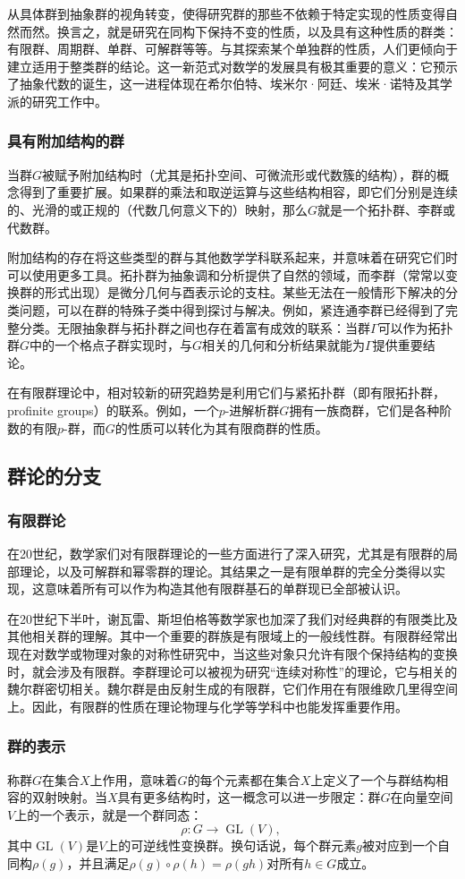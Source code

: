 从具体群到抽象群的视角转变，使得研究群的那些不依赖于特定实现的性质变得自然而然。换言之，就是研究在同构下保持不变的性质，以及具有这种性质的群类：有限群、周期群、单群、可解群等等。与其探索某个单独群的性质，人们更倾向于建立适用于整类群的结论。这一新范式对数学的发展具有极其重要的意义：它预示了抽象代数的诞生，这一进程体现在希尔伯特、埃米尔·阿廷、埃米·诺特及其学派的研究工作中。
\subsubsection{具有附加结构的群}
当群$G$被赋予附加结构时（尤其是拓扑空间、可微流形或代数簇的结构），群的概念得到了重要扩展。如果群的乘法和取逆运算与这些结构相容，即它们分别是连续的、光滑的或正规的（代数几何意义下的）映射，那么$G$就是一个拓扑群、李群或代数群。

附加结构的存在将这些类型的群与其他数学学科联系起来，并意味着在研究它们时可以使用更多工具。拓扑群为抽象调和分析提供了自然的领域，而李群（常常以变换群的形式出现）是微分几何与酉表示论的支柱。某些无法在一般情形下解决的分类问题，可以在群的特殊子类中得到探讨与解决。例如，紧连通李群已经得到了完整分类。无限抽象群与拓扑群之间也存在着富有成效的联系：当群$\Gamma$可以作为拓扑群$G$中的一个格点子群实现时，与$G$相关的几何和分析结果就能为$\Gamma$提供重要结论。

在有限群理论中，相对较新的研究趋势是利用它们与紧拓扑群（即有限拓扑群，profinite groups）的联系。例如，一个$p$-进解析群$G$拥有一族商群，它们是各种阶数的有限$p$-群，而$G$的性质可以转化为其有限商群的性质。
\subsection{群论的分支}
\subsubsection{有限群论}
在20世纪，数学家们对有限群理论的一些方面进行了深入研究，尤其是有限群的局部理论，以及可解群和幂零群的理论。其结果之一是有限单群的完全分类得以实现，这意味着所有可以作为构造其他有限群基石的单群现已全部被认识。

在20世纪下半叶，谢瓦雷、斯坦伯格等数学家也加深了我们对经典群的有限类比及其他相关群的理解。其中一个重要的群族是有限域上的一般线性群。有限群经常出现在对数学或物理对象的对称性研究中，当这些对象只允许有限个保持结构的变换时，就会涉及有限群。李群理论可以被视为研究“连续对称性”的理论，它与相关的魏尔群密切相关。魏尔群是由反射生成的有限群，它们作用在有限维欧几里得空间上。因此，有限群的性质在理论物理与化学等学科中也能发挥重要作用。
\subsubsection{群的表示}
称群$G$在集合$X$上作用，意味着$G$的每个元素都在集合$X$上定义了一个与群结构相容的双射映射。当$X$具有更多结构时，这一概念可以进一步限定：群$G$在向量空间$V$上的一个表示，就是一个群同态：
$$
\rho : G \to \operatorname{GL}(V),~
$$
其中$\operatorname{GL}(V)$是$V$上的可逆线性变换群。换句话说，每个群元素$g$被对应到一个自同构$\rho(g)$，并且满足$\rho(g) \circ \rho(h) = \rho(gh)$对所有$h \in G$成立。

